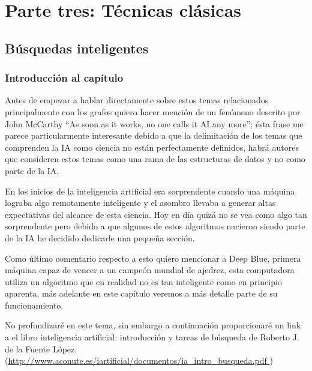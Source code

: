 \documentclass[11pt,fleqn]{book} %
\begin{document}
\part{Parte tres: Técnicas clásicas}



\chapter{Búsquedas inteligentes}

\section{Introducción al capítulo}

Antes de empezar a hablar directamente sobre estos temas relacionados principalmente con los grafos quiero hacer mención de un fenómeno descrito por John McCarthy “As soon as it works, no one calls it AI any more”; ésta frase me parece particularmente interesante debido a que la delimitación de los temas que comprenden la IA como ciencia no están perfectamente definidos, habrá autores que consideren estos temas como una rama de las estructuras de datos y no como parte de la IA.

En los inicios de la inteligencia artificial era sorprendente cuando una máquina lograba algo remotamente inteligente y el asombro llevaba a generar altas expectativas del alcance de esta ciencia. Hoy en día quizá no se vea como algo tan sorprendente pero debido a que algunos de estos algoritmos nacieron siendo parte de la IA he decidido dedicarle una pequeña sección.

Como último comentario respecto a esto quiero mencionar a Deep Blue, primera máquina capaz de vencer a un campeón mundial de ajedrez, esta computadora utiliza un algoritmo que en realidad no es tan inteligente como en principio aparenta, más adelante en este capítulo veremos a más detalle parte de su funcionamiento.

No profundizaré en este tema, sin embargo a continuación proporcionaré un link a el libro inteligencia artificial: introducción y tareas de búsqueda de Roberto J. de la Fuente López. (\url{http://www.aconute.es/iartificial/documentos/ia_intro_busqueda.pdf })
\end{document}
